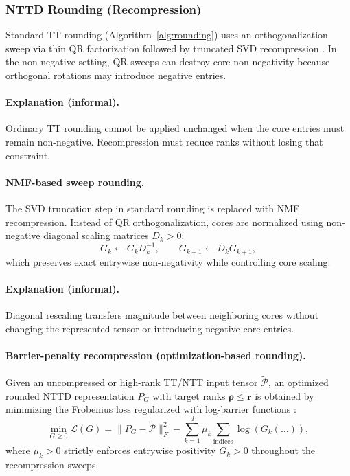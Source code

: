 \documentclass[11pt,a4paper,parskip=half-]{scrartcl}
\theoremstyle{definition}
\theoremstyle{plain}
\theoremstyle{remark}
\begin{document}
\subsubsection{NTTD Rounding (Recompression)}
\label{sec:nttd_rounding}

Standard TT rounding (Algorithm~\ref{alg:rounding}) uses an orthogonalization
sweep via thin QR factorization followed by truncated SVD recompression
\cite{Oseledets2011TT}. In the non-negative setting, QR sweeps can destroy
core non-negativity because orthogonal rotations may introduce negative
entries.

\paragraph{Explanation (informal).}
Ordinary TT rounding cannot be applied unchanged when the core entries must
remain non-negative. Recompression must reduce ranks without losing that
constraint.

\paragraph{NMF-based sweep rounding.}
The SVD truncation step in standard rounding is replaced with NMF
recompression. Instead of QR orthogonalization, cores are normalized using
non-negative diagonal scaling matrices $D_k > 0$:
\begin{equation}
G_k \leftarrow G_k D_k^{-1}, \qquad G_{k+1} \leftarrow D_k G_{k+1},
\end{equation}
which preserves exact entrywise non-negativity while controlling core scaling.

\paragraph{Explanation (informal).}
Diagonal rescaling transfers magnitude between neighboring cores without
changing the represented tensor or introducing negative core entries.

\paragraph{Barrier-penalty recompression (optimization-based rounding).}
Given an uncompressed or high-rank TT/NTT input tensor
$\widetilde{\mathcal{P}}$, an optimized rounded NTTD representation $P_G$ with
target ranks $\boldsymbol{\rho} \le \mathbf{r}$ is obtained by minimizing the
Frobenius loss regularized with log-barrier functions \cite{tang2026density}:
\begin{equation}
\min_{G \ge 0} \mathcal{L}(G) = \|P_G - \widetilde{\mathcal{P}}\|_F^2 - \sum_{k=1}^d \mu_k \sum_{\text{indices}} \log\left(G_k(\dots)\right),
\end{equation}
where $\mu_k > 0$ strictly enforces entrywise positivity $G_k > 0$ throughout the recompression sweeps.
\end{document}

